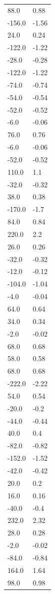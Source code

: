 \begin{longtable}{ll}
88.0 & 0.88 \\
-156.0 & -1.56 \\
24.0 & 0.24 \\
-122.0 & -1.22 \\
-28.0 & -0.28 \\
-122.0 & -1.22 \\
-74.0 & -0.74 \\
-54.0 & -0.54 \\
-52.0 & -0.52 \\
-6.0 & -0.06 \\
76.0 & 0.76 \\
-6.0 & -0.06 \\
-52.0 & -0.52 \\
110.0 & 1.1 \\
-32.0 & -0.32 \\
38.0 & 0.38 \\
-170.0 & -1.7 \\
84.0 & 0.84 \\
220.0 & 2.2 \\
26.0 & 0.26 \\
-32.0 & -0.32 \\
-12.0 & -0.12 \\
-104.0 & -1.04 \\
-4.0 & -0.04 \\
64.0 & 0.64 \\
34.0 & 0.34 \\
-2.0 & -0.02 \\
68.0 & 0.68 \\
58.0 & 0.58 \\
68.0 & 0.68 \\
-222.0 & -2.22 \\
54.0 & 0.54 \\
-20.0 & -0.2 \\
-44.0 & -0.44 \\
40.0 & 0.4 \\
-82.0 & -0.82 \\
-152.0 & -1.52 \\
-42.0 & -0.42 \\
20.0 & 0.2 \\
16.0 & 0.16 \\
-40.0 & -0.4 \\
232.0 & 2.32 \\
28.0 & 0.28 \\
-2.0 & -0.02 \\
-84.0 & -0.84 \\
164.0 & 1.64 \\
98.0 & 0.98 \\

\end{longtable}
